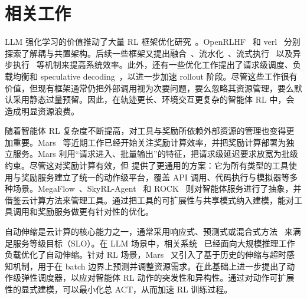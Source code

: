 \section{相关工作}

LLM 强化学习的价值推动了大量 RL 框架优化研究~\citep{yao2023deepspeed,sheng2025hybridflow,hu2024openrlhf,zhong2025optimizing,zhong2025streamrl,fu2025areal,he2025history,wang2025distflow,lei2024puzzle,shen2024nemo,han2025asyncflow}。OpenRLHF~\citep{hu2024openrlhf} 和 verl~\citep{sheng2025hybridflow} 分别探索了解耦与共置架构。后续一些框架又提出融合~\citep{zhong2025optimizing}、流水化~\citep{zhong2025optimizing}、流式执行~\citep{zhong2025streamrl} 以及异步执行~\citep{fu2025areal} 等机制来提高系统效率。此外，还有一些优化工作提出了请求级调度、负载均衡和 speculative decoding~\citep{gao2025rollpacker,jinefficient}，以进一步加速 rollout 阶段。尽管这些工作很有价值，但现有框架通常仍把外部调用视为次要问题，要么忽略其资源管理，要么默认采用静态过量预留。因此，在轨迹更长、环境交互更复杂的智能体 RL 中，会造成明显资源浪费。

随着智能体 RL 复杂度不断提高，对工具与奖励所依赖外部资源的管理也变得更加重要。Mars~\citep{zhu2026mars} 等近期工作已经开始关注奖励计算效率，并把奖励计算部署为独立服务。Mars 利用“请求进入、批量输出”的特征，把请求级延迟要求放宽为批级约束。尽管这对奖励计算有效，但 \sysname 提供了更通用的方案：它为所有类型的工具使用与奖励服务建立了统一的动作级平台，覆盖 API 调用、代码执行与模拟器等多种场景。MegaFlow~\citep{zhang2026megaflow}、SkyRL-Agent~\citep{cao2025skyrl} 和 ROCK~\citep{wang2025let} 则对智能体服务进行了抽象，并借鉴云计算方法来管理工具。通过把工具的可扩展性与共享模式纳入建模，\sysname 能对工具调用和奖励服务做更有针对性的优化。

自动伸缩是云计算的核心能力之一，通常采用响应式、预测式或混合式方法~\citep{lorido2014review,wu2023xron,wang2024autothrottle,wu2024can,zhang2024jolteon} 来满足服务等级目标（SLO）。在 LLM 场景中，相关系统~\citep{zhang2025blitzscale,yu2025lambda,xiang2025aegaeon,zhao2025seallm} 已经面向大规模推理工作负载优化了自动伸缩。针对 RL 场景，Mars~\citep{zhu2026mars} 又引入了基于历史的伸缩与超时感知机制，用于在 batch 边界上预测并调整资源需求。\sysname 在此基础上进一步提出了动作级弹性调度器，以应对智能体 RL 动作的突发性和异构性。通过对动作可扩展性的显式建模，\sysname 可以最小化总 ACT，从而加速 RL 训练过程。
